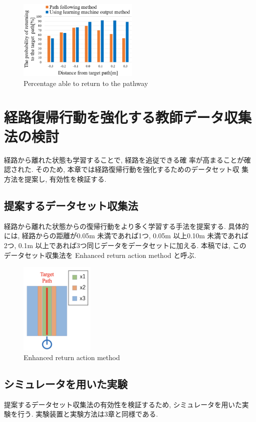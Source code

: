 \documentclass{jarticle}
\begin{document}
\begin{figure}[h!]
  \centering
   \includegraphics[height=38.97mm]{./figs/kaiseki2.png}
   \caption{Percentage able to return to the pathway}
\end{figure}



\section{経路復帰行動を強化する教師データ収集法の検討}

経路から離れた状態も学習することで, 経路を追従できる確
率が高まることが確認された. そのため, 本章では経路復帰行動を強化するためのデータセット収
集方法を提案し, 有効性を検証する.

\subsection{提案するデータセット収集法}
経路から離れた状態からの復帰行動をより多く学習する手法を提案する. 
具体的には, 経路からの距離が0.05m 未満であれば1つ, 
0.05m 以上0.10m 未満であれば2つ, 0.1m 以上であれば3つ同じデータをデータセットに加える.
本稿では, このデータセット収集法を Enhanced return action method と呼ぶ.

\begin{figure}[h!]\vspace*{-3mm}
  \centering
   \includegraphics[height=45mm]{./figs/method.png}
   \caption{Enhanced return action method}
\end{figure}


\subsection{シミュレータを用いた実験}
提案するデータセット収集法の有効性を検証するため, シミュレータを用いた実験を行う.
実験装置と実験方法は3章と同様である.
\vspace*{2.5mm}
\end{document}
